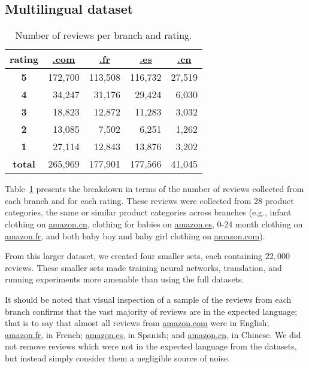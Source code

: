 \documentclass[11pt,a4paper]{article}
\newcommand{\amazon}[1]{\href{http://www.amazon.#1}{amazon.#1}}
\begin{document}
\subsection{Multilingual dataset}
    \begin{table}[t!]
        \begin{tabular}{crrrr}
            \toprule
                \textbf{rating} &
                \multicolumn{1}{c}{\href{http://www.amazon.com}{.com}} &
                \multicolumn{1}{c}{\href{http://www.amazon.fr}{.fr}} &
                \multicolumn{1}{c}{\href{http://www.amazon.es}{.es}} &
                \multicolumn{1}{c}{\href{http://www.amazon.cn}{.cn}} \\
            \midrule
                \textbf{5} & 172,700 & 113,508 & 116,732 & 27,519\\
                \textbf{4} & 34,247  & 31,176  & 29,424  & 6,030\\
                \textbf{3} & 18,823  & 12,872  & 11,283  & 3,032\\
                \textbf{2} & 13,085  & 7,502   & 6,251   & 1,262\\
                \textbf{1} & 27,114  & 12,843  & 13,876  & 3,202\\
            \midrule
                \textbf{total} & 265,969 & 177,901 & 177,566 & 41,045\\
            \bottomrule
        \end{tabular}
        \caption{Number of reviews per branch and rating.}
        \label{NumberReviews}
    \end{table}
    
    Table~\ref{NumberReviews} presents the breakdown in terms of the number of reviews collected from each branch and for each rating. These reviews were collected from 28 product categories, the same or similar product categories across branches (e.g., infant clothing on \amazon{cn}, clothing for babies on \amazon{es}, 0-24 month clothing on \amazon{fr}, and both baby boy and baby girl clothing on \amazon{com}).
    
    From this larger dataset, we created four smaller sets, each containing $22,000$ reviews. These smaller sets made training neural networks, translation, and running experiments more amenable than using the full datasets.
    
    It should be noted that visual inspection of a sample of the reviews from each branch confirms that the vast majority of reviews are in the expected language; that is to say that almost all reviews from \amazon{com} were in English; \amazon{fr}, in French; \amazon{es}, in Spanish; and \amazon{cn}, in Chinese. We did not remove reviews which were not in the expected language from the datasets, but instead simply consider them a negligible source of noise.
\end{document}
